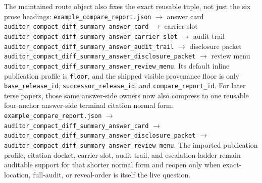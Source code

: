 \documentclass[11pt]{article}
\begin{document}
The maintained route object also fixes the exact reusable tuple, not just the six prose headings:
\texttt{example\_compare\_report.json} $\to$ answer card \texttt{auditor\_compact\_diff\_summary\_answer\_card} $\to$ carrier slot \texttt{auditor\_compact\_diff\_summary\_answer\_carrier\_slot} $\to$ audit trail \texttt{auditor\_compact\_diff\_summary\_answer\_audit\_trail} $\to$ disclosure packet \texttt{auditor\_compact\_diff\_summary\_answer\_disclosure\_packet} $\to$ review menu \texttt{auditor\_compact\_diff\_summary\_answer\_review\_menu}.
Its default inline publication profile is \texttt{floor}, and the shipped visible provenance floor is only \texttt{base\_release\_id}, \texttt{successor\_release\_id}, and \texttt{compare\_report\_id}. For later terse papers, those same answer-side owners now also compress to one reusable four-anchor answer-side terminal citation normal form: \nolinkurl{example_compare_report.json} $\to$ \texttt{auditor\_compact\_diff\_summary\_answer\_card} $\to$ \texttt{auditor\_compact\_diff\_summary\_answer\_disclosure\_packet} $\to$ \texttt{auditor\_compact\_diff\_summary\_answer\_review\_menu}. The imported publication profile, citation docket, carrier slot, audit trail, and escalation ladder remain auditable support for that shorter normal form and reopen only when exact-location, full-audit, or reveal-order is itself the live question.
\end{document}
